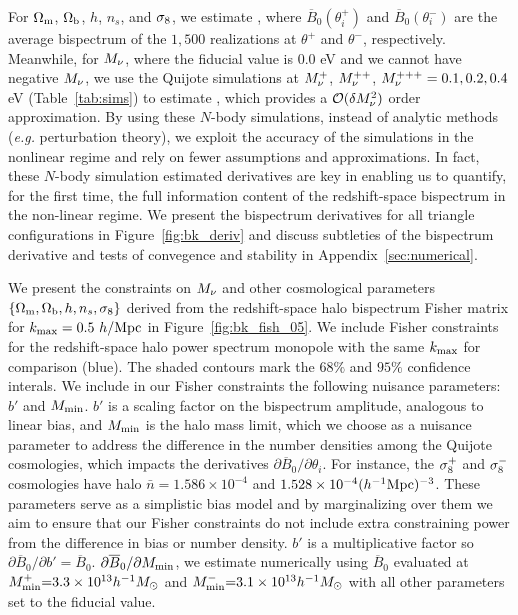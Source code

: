 For $\Omega_{\rm m}$, $\Omega_{\rm b}$, $h$, $n_s$, and $\sigma_8$, we estimate 
\beq \label{eq:dbkdt} 
 \approx {}, 
\eeq
where $\overline{B}_0(\theta_i^{+})$ and $\overline{B}_0(\theta_i^{-})$ are 
the average bispectrum of the $1,500$ realizations at $\theta^{+}$ and $\theta^{-}$, 
respectively. Meanwhile, for $M_\nu$, where the fiducial value is 0.0 eV and we 
cannot have negative $M_\nu$, we use the Quijote simulations at $M_\nu^+$, 
$M_\nu^{++}$, 
$M_\nu^{+++}=0.1, 0.2, 0.4$ eV (Table~\ref{tab:sims}) to estimate 
\beq \label{eq:dbkdmnu} 
 \approx {}, 
\eeq
which provides a $\mathcal{O}(\delta M_\nu^2)$ order approximation. By using these 
$N$-body simulations, instead of analytic methods (\emph{e.g.} perturbation theory), 
we exploit the accuracy of the simulations in the nonlinear regime and rely on fewer 
assumptions and approximations. In fact, these $N$-body simulation estimated 
derivatives are key in enabling us to quantify, for the first time, the full information 
content of the redshift-space bispectrum in the non-linear regime. We present the 
bispectrum derivatives for all triangle configurations in Figure~\ref{fig:bk_deriv} and  
discuss subtleties of the bispectrum derivative and tests of convegence and stability 
in Appendix~\ref{sec:numerical}. 

We present the constraints on $M_\nu$ and other cosmological parameters 
$\{\Omega_{\rm m}, \Omega_{\rm b}, h, n_s, \sigma_8\}$ derived from the redshift-space halo bispectrum 
Fisher matrix for $k_{\rm max} = 0.5~h/{\rm Mpc}$ in Figure~\ref{fig:bk_fish_05}. 
We include Fisher constraints for the redshift-space halo power spectrum 
monopole with the same $k_{\rm max}$ for comparison (blue). The shaded contours 
mark the $68\%$ and $95\%$ confidence interals. We include in our 
Fisher constraints the following nuisance parameters: $b'$ and $M_{\rm min}$. 
$b'$ is a scaling factor on the bispectrum amplitude, analogous to linear bias, 
and $M_{\rm min}$ is the halo mass limit, which we choose as a nuisance
parameter to address the difference in the number densities among the Quijote
cosmologies, which impacts the derivatives $\partial \overline{B}_0/\partial \theta_i$. 
For instance, the $\sigma_8^{+}$ and $\sigma_8^{-}$ cosmologies have halo 
$\bar{n} = 1.586\times10^{-4}$ and $1.528 \times 10^{-4}(h^{-1}{\rm Mpc})^{-3}$. 
These parameters serve as a simplistic bias model and by marginalizing 
over them we aim to ensure that our Fisher constraints do not include extra 
constraining power from the difference in bias or number density. $b'$ is a 
multiplicative factor so $\partial \overline{B}_0/\partial b' = \overline{B}_0$. 
$\partial \overline{B}_0/\partial M_{\rm min}$, we estimate numerically using 
$\overline{B}_0$ evaluated at $M^{+}_{\rm min}{=}3.3\times10^{13}h^{-1}M_\odot$ 
and $M^{-}_{\rm min}{=}3.1\times10^{13}h^{-1}M_\odot$ with all other parameters 
set to the fiducial value. 

